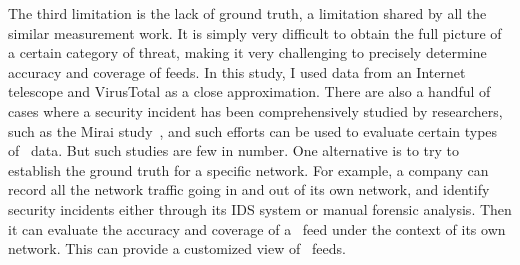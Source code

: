 The third limitation is the lack of ground truth, a limitation shared
by all the similar measurement work. It is simply very difficult to obtain the full picture
of a certain category of threat, making it very challenging to precisely determine accuracy and coverage of feeds. In this
study, I used data from an Internet telescope and VirusTotal as a close approximation.
There are also a handful of cases where a security incident has been comprehensively studied by
researchers, such as the Mirai study~\cite{antonakakis2017understanding}, and such efforts
can be used to evaluate certain types of \ti\ data. But such studies are few in number.
One alternative is to try to establish the ground truth for a specific network.
For example, a company can record all the network traffic going in and out of its own network,
and identify security incidents either through its IDS system or manual forensic analysis.
Then it can evaluate the accuracy and coverage of a \ti\ feed under the context of its
own network. This can provide a customized view of \ti\ feeds.



